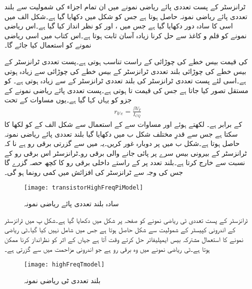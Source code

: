 ٹرانزسٹر کے پست تعددی پائے ریاضی نمونے میں ان تمام اجزاء کی شمولیت سے بلند تعددی پائے ریاضی نمونہ حاصل ہوتا ہے جس کو شکل  میں دکھایا گیا ہے۔شکل  الف میں اسی کا سادہ دور دکھایا گیا ہے  جس میں ، اور  کو نظر انداز کیا گیا ہے۔اس ریاضی نمونے کو قلم و کاغذ سے حل کرنا زیادہ آسان ثابت ہوتا ہے۔اس کتاب میں اسی ریاضی نمونے کو استعمال کیا جائے گا۔

 کی قیمت بیس  خطے کی چوڑائی کے راست تناسب ہوتی ہے۔پست تعددی ٹرانزسٹر کے بیس  خطے کی چوڑائی بلند تعددی ٹرانزسٹر کے بیس  خطے کی چوڑائی سے زیادہ ہوتی ہے۔اسی لئے پست تعددی ٹرانزسٹر کی  بلند تعددی ٹرانزسٹر کے  سے زیادہ ہوتی ہے۔ کو مستقل تصور کیا جاتا ہے جس کی قیمت  تا  ہوتی ہے۔پست تعددی پائے ریاضی نمونے کے جزو  کو یہاں  کہا گیا ہے۔یوں مساوات  کے تحت
\begin{align}
r_{b'e}=\frac{\beta V_T}{I_{CQ}}
\end{align}
کے برابر ہے۔ لکھتے ہوئے اور مساوات  سے  کے استعمال سے شکل  الف کے  کو  لکھا کا سکتا ہے جس سے قدرِ مختلف شکل  ب میں دکھایا گیا بلند تعددی پائے ریاضی نمونہ  حاصل ہوتا ہے۔شکل  ب میں  پر دوبارہ غور کریں۔یہ  میں سے گزرتی برقی رو ہے نا کہ ٹرانزسٹر کے بیرونی بیس  سرے پر پائی جانے والی برقی رو۔ٹرانزسٹر اس برقی رو کے نسبت سے  خارج کرتا ہے۔بلند تعدد پر  کے راستے داخلی برقی رو کا کچھ حصہ گزرے گا جس کی وجہ سے ٹرانزسٹر کی افزائش میں کمی رونما ہو گی۔
\begin{figure}
\centering
\texttt{[image: transistorHighFreqPiModel]}
\caption{سادہ بلند تعددی پائے ریاضی نمونہ }
\label{شکل_تعددی_ردعمل_بلند_تعددی_ماڈل}
\end{figure}
ٹرانزسٹر کے پست تعددی ٹی ریاضی نمونے کو صفحہ  پر شکل  میں دکھایا گیا ہے۔شکل  پ میں ٹرانزسٹر کے اندرونی کپیسٹر کے شمولیت سے شکل  حاصل ہوتا ہے جس میں  شامل نہیں کیا گیا۔ٹی ریاضی نمونے کا استعمال مشترکہ بیس  ایمپلیفائر حل کرتے وقت آتا ہے جہاں  کے اثر کو نظرانداز کرنا ممکن ہوتا ہے۔ٹی ریاضی نمونے میں  وہ برقی رو ہے جو اندرونی مزاحمت  میں سے گزرتی ہے۔
\begin{figure}
\centering
\texttt{[image: highFreqTmodel]}
\caption{بلند تعددی ٹی ریاضی نمونہ }
\label{شکل_تعددی_ردعمل_بلند_تعددی_ٹی_ماڈل}
\end{figure}

